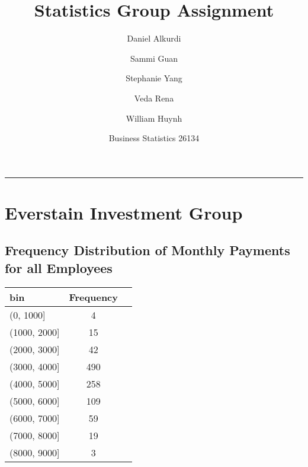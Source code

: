 \documentclass[11pt]{article}
\title{\textbf{Statistics Group Assignment}}
\author{Daniel Alkurdi \\ \and Sammi Guan \\ \and Stephanie Yang \\ \and Veda Rena \\ \and William Huynh}
\date{\small{Business Statistics 26134}}
\begin{document}
\maketitle

\hrule
\tableofcontents

\newpage
\section{Everstain Investment Group}
\subsection{Frequency Distribution of Monthly Payments for all Employees}

\begin{tabular}{l|cc}
  bin& Frequency& \\
  \hline
  (0, 1000]& 4& \\
  (1000, 2000]& 15&\\
  (2000, 3000]& 42&\\
  (3000, 4000]& 490&\\
  (4000, 5000]& 258&\\
  (5000, 6000]& 109&\\
  (6000, 7000]& 59&\\
  (7000, 8000]& 19&\\
  (8000, 9000]& 3&\\
\end{tabular}
\end{document}
